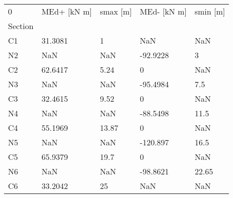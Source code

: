 \begin{tabular}{lllll}
\toprule
0 & MEd+ [kN m] & smax [m] & MEd- [kN m] & smin [m] \\
Section &             &          &             &          \\
\midrule
C1      &     31.3081 &        1 &         NaN &      NaN \\
N2      &         NaN &      NaN &    -92.9228 &        3 \\
C2      &     62.6417 &     5.24 &           0 &      NaN \\
N3      &         NaN &      NaN &    -95.4984 &      7.5 \\
C3      &     32.4615 &     9.52 &           0 &      NaN \\
N4      &         NaN &      NaN &    -88.5498 &     11.5 \\
C4      &     55.1969 &    13.87 &           0 &      NaN \\
N5      &         NaN &      NaN &    -120.897 &     16.5 \\
C5      &     65.9379 &     19.7 &           0 &      NaN \\
N6      &         NaN &      NaN &    -98.8621 &    22.65 \\
C6      &     33.2042 &       25 &         NaN &      NaN \\
\bottomrule
\end{tabular}
